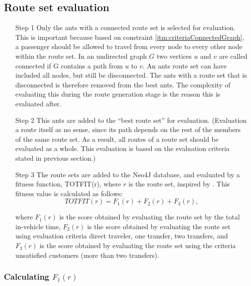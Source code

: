 \subsection{Route set evaluation}


\begin{itemize}
\item[Step 1] Only the ants with a connected route set is selected for evaluation. This is important because based on constraint \ref{itm:criteriaConnectedGraph}, a passenger should be allowed to travel from every node to every other node within the route set. In an undirected graph $G$ two vertices $u$ and $v$ are called connected if G contains a path from $u$ to $v$. An ants route set can have included all nodes, but still be disconnected. The ants with a route set that is disconnected is therefore removed from the best ants. The complexity of evaluating this during the route generation stage is the reason this is evaluated after. 

\item[Step 2] This ants are added to the ``best route set'' for evaluation. (Evaluation a route itself as no sense, since its path depends on the rest of the members of the same route set. As a result, all routes of a route set should be evaluated as a whole. This evaluation is based on the evaluation criteria stated in previous section.)

\item [Step 3] The route sets are added to the Neo4J database, and evaluated by a fitness function, TOTFIT(r), where $r$ is the route set, inspired by \citep{kechagiopoulos14}.
This fitness value is calculated as follows:
$$ TOTFIT(r) = F_{1}(r) + F_{2}(r) + F_{3}(r), $$

where $ F_{1}(r)$ is the score obtained by evaluating the route set by the total in-vehicle time, $ F_{2}(r)$ is the score obtained by evaluating the route set using evaluation criteria direct traveler, one transfer, two transfers, and $ F_{3}(r)$ is the score obtained by evaluating the route set using the criteria unsatisfied customers (more than two transfers). 
\end{itemize}

\subsubsection{Calculating $F_{1}(r)$}

